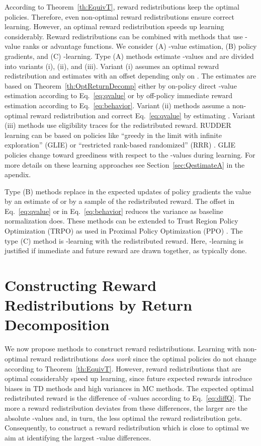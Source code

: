 \documentclass{article}
\begin{document}
According to Theorem~\ref{th:EquivT}, reward redistributions
keep the optimal policies. 
Therefore, even non-optimal reward redistributions ensure correct learning. 
However, an optimal reward redistribution speeds up learning considerably.
Reward redistributions can be combined 
with methods that use -value ranks or advantage functions.
We consider 
(A) -value estimation, 
(B) policy gradients, and 
(C) -learning.
Type (A) methods estimate -values and are divided 
into variants (i), (ii), and (iii).
Variant (i) assumes an optimal reward redistribution
and estimates  with an offset
depending only on .
The estimates are based on Theorem~\ref{th:OptReturnDecomp}
either by on-policy direct -value estimation according to Eq.~\eqref{eq:qvalue}
or by off-policy immediate reward estimation according to Eq.~\eqref{eq:behavior}.
Variant (ii) methods assume a non-optimal reward redistribution and 
correct Eq.~\eqref{eq:qvalue} by estimating .
Variant (iii) methods use eligibility traces for the redistributed reward.
RUDDER learning can be based on policies like
``greedy in the limit with infinite exploration'' (GLIE) or
``restricted rank-based randomized'' (RRR) \cite{Singh:00}. 
GLIE policies change toward greediness with respect to the -values
during learning.
For more details on these learning approaches 
see Section~\ref{sec:QestimateA} in the apendix.

Type (B) methods replace in the expected updates  
 of policy gradients the value  
by an estimate of  or by
a sample of the redistributed reward. 
The offset  in Eq.~\eqref{eq:qvalue}
or   in Eq.~\eqref{eq:behavior}
reduces the variance as baseline normalization does. 
These methods can be extended to Trust Region Policy
Optimization (TRPO) \cite{Schulman:15icml} as used in 
Proximal Policy Optimization (PPO) \cite{Schulman:17}.
The type (C) method is -learning with the redistributed reward. 
Here, -learning is justified if
immediate and future reward are drawn together,
as typically done.


\section{Constructing Reward Redistributions by Return Decomposition}


We now propose methods to construct reward redistributions. 
Learning with non-optimal reward redistributions {\em does work} since the 
optimal policies do not change according to Theorem~\ref{th:EquivT}.
However, reward redistributions that are optimal considerably speed up learning,
since future expected rewards introduce 
biases in TD methods and high variances in MC methods.
The expected optimal redistributed reward is 
the difference of -values according to Eq.~\eqref{eq:diffQ}. 
The more a reward redistribution deviates from these differences,
the larger are the absolute -values and, in turn, the less optimal
the reward redistribution gets.
Consequently, to construct a reward redistribution which is close to optimal
we aim at identifying the largest -value differences.
\end{document}

